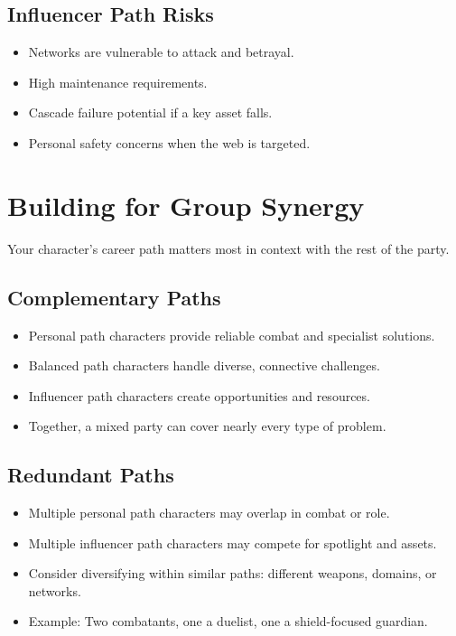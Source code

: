\subsection*{Influencer Path Risks}
\begin{itemize}
\item Networks are vulnerable to attack and betrayal.
\item High maintenance requirements.
\item Cascade failure potential if a key asset falls.
\item Personal safety concerns when the web is targeted.
\end{itemize}


\section{Building for Group Synergy}
\label{sec:xp-synergy}

Your character's career path matters most in context with the rest of the
party.

\subsection*{Complementary Paths}
\begin{itemize}
\item Personal path characters provide reliable combat and specialist solutions.
\item Balanced path characters handle diverse, connective challenges.
\item Influencer path characters create opportunities and resources.
\item Together, a mixed party can cover nearly every type of problem.
\end{itemize}

\subsection*{Redundant Paths}
\begin{itemize}
\item Multiple personal path characters may overlap in combat or role.
\item Multiple influencer path characters may compete for spotlight and assets.
\item Consider diversifying within similar paths: different weapons, domains, or networks.
\item Example: Two combatants, one a duelist, one a shield-focused guardian.
\end{itemize}


